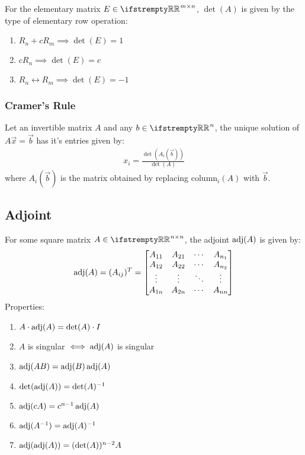 \documentclass[12pt, a4paper]{article}
\begin{document}
\begin{multicols*}{3}
For the elementary matrix $E \in \RR^{m{\times}n}$, $\det(A)$ is given by the type of elementary row operation:
\begin{enumerate}[\roman*.]
  \item $ R_n + cR_m\implies \det(E) = 1$
  \item $cR_n \implies \det(E) = c$
  \item $R_n \leftrightarrow R_m \implies \det(E) = -1$
\end{enumerate}

\subsubsection{Cramer's Rule}
Let an invertible matrix $A$ and any $b \in \RR^n$, the unique solution of $A\vec{x} = \vec{b}$ has it's entries given by:
\begin{align*}
  x_i = \frac{\det(A_i(\vec{b}))}{\det(A)}
\end{align*}
where $A_i(\vec{b})$ is the matrix obtained by replacing column$_i(A)$ with $\vec{b}$.

\colbreak

\subsection{Adjoint}
For some square matrix $A \in \RR^{n{\times}n}$, the adjoint $\operatorname{adj}(A)$ is given by:
\begin{gather*}
  \operatorname{adj}(A) = (A_{ij})^T = 
  \begin{bmatrix}
    A_{11} & A_{21} & \cdots & A_{n_1} \\
    A_{12} & A_{22} & \cdots & A_{n_2} \\
    \vdots & \vdots & \ddots & \vdots \\
    A_{1n} & A_{2n} & \cdots & A_{nn}
  \end{bmatrix}  
\end{gather*}
Properties:
\begin{enumerate}[\roman*.]
  \item $A\cdot\operatorname{adj}(A) = \det(A)\cdot I$
  \item $A$ is singular $\iff \operatorname{adj}(A)$ is singular
  \item $\operatorname{adj}(AB) = \operatorname{adj}(B)\operatorname{adj}(A)$
  \item $\det(\operatorname{adj}(A)) = \det(A)^{-1}$
  \item $\operatorname{adj}(cA) = c^{n-1}\operatorname{adj}(A)$
  \item $\operatorname{adj}(A^{-1}) = \operatorname{adj}(A)^{-1}$
  \item $\operatorname{adj}(\operatorname{adj}(A)) =  (\det(A))^{n-2}A$
\end{enumerate}


\end{multicols*}
\end{document}
